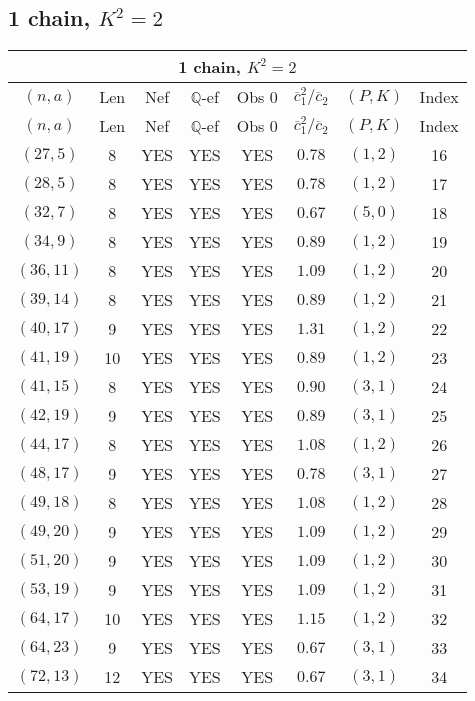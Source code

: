 \subsection{1 chain, $K^2 = 2$}
\begin{longtable}{|c|c|c|c|c|c|c|c|}
\hline
\multicolumn{8}{|c|}{1 chain, $K^2 = 2$}\\
\hline
$(n,a)$ & Len & Nef & $\mathbb Q$-ef & Obs 0 & $\overline c_1^2 / \overline c_2$ & $(P,K)$ & Index\\
\hline
\endfirsthead

\hline
$(n,a)$ & Len & Nef & $\mathbb Q$-ef & Obs 0 & $\overline c_1^2 / \overline c_2$ & $(P,K)$ & Index\\
\hline
\endhead
\hline
\endfoot

$(27,5)$ & 8 & YES & YES & YES & $0.78$ & $(1,2)$ & 16\\
$(28,5)$ & 8 & YES & YES & YES & $0.78$ & $(1,2)$ & 17\\
$(32,7)$ & 8 & YES & YES & YES & $0.67$ & $(5,0)$ & 18\\
$(34,9)$ & 8 & YES & YES & YES & $0.89$ & $(1,2)$ & 19\\
$(36,11)$ & 8 & YES & YES & YES & $1.09$ & $(1,2)$ & 20\\
$(39,14)$ & 8 & YES & YES & YES & $0.89$ & $(1,2)$ & 21\\
$(40,17)$ & 9 & YES & YES & YES & $1.31$ & $(1,2)$ & 22\\
$(41,19)$ & 10 & YES & YES & YES & $0.89$ & $(1,2)$ & 23\\
$(41,15)$ & 8 & YES & YES & YES & $0.90$ & $(3,1)$ & 24\\
$(42,19)$ & 9 & YES & YES & YES & $0.89$ & $(3,1)$ & 25\\
$(44,17)$ & 8 & YES & YES & YES & $1.08$ & $(1,2)$ & 26\\
$(48,17)$ & 9 & YES & YES & YES & $0.78$ & $(3,1)$ & 27\\
$(49,18)$ & 8 & YES & YES & YES & $1.08$ & $(1,2)$ & 28\\
$(49,20)$ & 9 & YES & YES & YES & $1.09$ & $(1,2)$ & 29\\
$(51,20)$ & 9 & YES & YES & YES & $1.09$ & $(1,2)$ & 30\\
$(53,19)$ & 9 & YES & YES & YES & $1.09$ & $(1,2)$ & 31\\
$(64,17)$ & 10 & YES & YES & YES & $1.15$ & $(1,2)$ & 32\\
$(64,23)$ & 9 & YES & YES & YES & $0.67$ & $(3,1)$ & 33\\
$(72,13)$ & 12 & YES & YES & YES & $0.67$ & $(3,1)$ & 34\\

\end{longtable}

